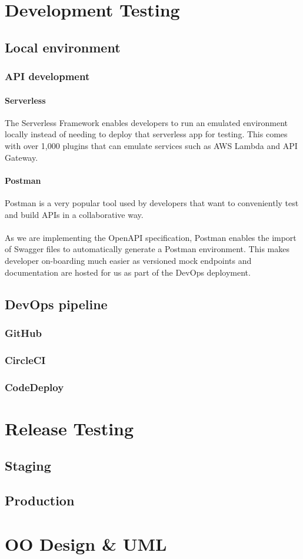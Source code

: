 \documentclass[10pt]{article}
\begin{document}
\newpage
\section{Development Testing}
\subsection{Local environment}
\subsubsection{API development}
\paragraph{Serverless}
The Serverless Framework enables developers to run an emulated environment locally instead of needing to deploy that serverless app for testing. This comes with over 1,000 plugins that can emulate services such as AWS Lambda and API Gateway. 
\paragraph{Postman}

Postman is a very popular tool used by developers that want to conveniently test and build APIs in a collaborative way.
\\ \\
As we are implementing the OpenAPI specification, Postman enables the import of Swagger files to automatically generate a Postman environment. This makes developer on-boarding much easier as versioned mock endpoints and documentation are hosted for us as part of the DevOps deployment.


\subsection{DevOps pipeline}
\subsubsection{GitHub}
\subsubsection{CircleCI}
\subsubsection{CodeDeploy}

\section{Release Testing}
\subsection{Staging}
\subsection{Production}

\newpage
\section{OO Design \& UML}
\newpage

\printbibliography
\end{document}
